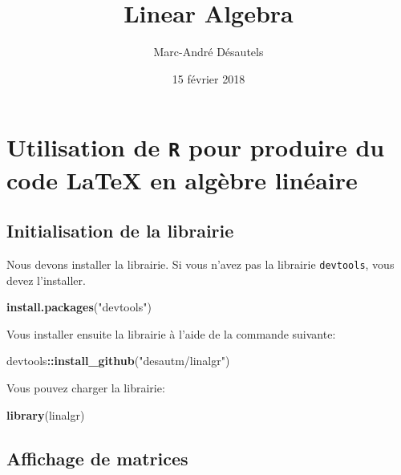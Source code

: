 \documentclass[]{article}
\title{Linear Algebra}
\author{Marc-André Désautels}
\date{15 février 2018}
\newenvironment{Shaded}{\begin{snugshade}}{\end{snugshade}}
\newcommand{\KeywordTok}[1]{\textcolor[rgb]{0.13,0.29,0.53}{\textbf{#1}}}
\newcommand{\NormalTok}[1]{#1}
\newcommand{\OperatorTok}[1]{\textcolor[rgb]{0.81,0.36,0.00}{\textbf{#1}}}
\newcommand{\StringTok}[1]{\textcolor[rgb]{0.31,0.60,0.02}{#1}}
\begin{document}
\maketitle

\hypertarget{utilisation-de-r-pour-produire-du-code-latex-en-algebre-lineaire}{%
\section{\texorpdfstring{Utilisation de \texttt{R} pour produire du code
LaTeX en algèbre
linéaire}{Utilisation de R pour produire du code LaTeX en algèbre linéaire}}\label{utilisation-de-r-pour-produire-du-code-latex-en-algebre-lineaire}}

\hypertarget{initialisation-de-la-librairie}{%
\subsection{Initialisation de la
librairie}\label{initialisation-de-la-librairie}}

Nous devons installer la librairie. Si vous n'avez pas la librairie
\texttt{devtools}, vous devez l'installer.

\begin{Shaded}
\begin{Highlighting}[]
\KeywordTok{install.packages}\NormalTok{(}\StringTok{"devtools"}\NormalTok{)}
\end{Highlighting}
\end{Shaded}

Vous installer ensuite la librairie à l'aide de la commande suivante:

\begin{Shaded}
\begin{Highlighting}[]
\NormalTok{devtools}\OperatorTok{::}\KeywordTok{install_github}\NormalTok{(}\StringTok{"desautm/linalgr"}\NormalTok{)}
\end{Highlighting}
\end{Shaded}

Vous pouvez charger la librairie:

\begin{Shaded}
\begin{Highlighting}[]
\KeywordTok{library}\NormalTok{(linalgr)}
\end{Highlighting}
\end{Shaded}

\hypertarget{affichage-de-matrices}{%
\subsection{Affichage de matrices}\label{affichage-de-matrices}}
\end{document}
